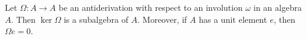 Let $\Omega: A \to A$ be an antiderivation with respect to an involution $\omega$ in an algebra $A$. Then $\ker \Omega$ is a subalgebra of $A$. Moreover, if $A$ has a unit element $e$, then $\Omega e = 0$.
